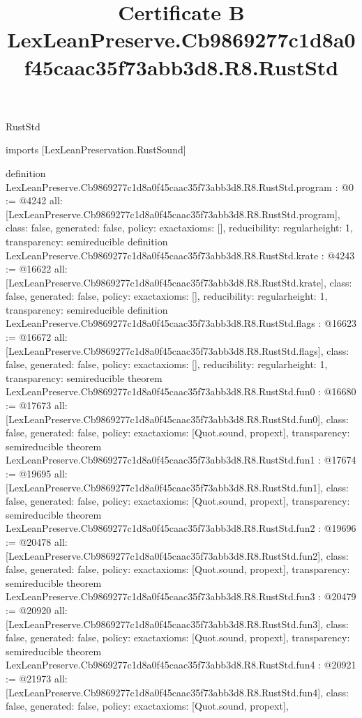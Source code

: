 \begin{lexlean}{RustStd}
\title{Certificate B LexLeanPreserve.Cb9869277c1d8a0f45caac35f73abb3d8.R8.RustStd}
\begin{coremodule}
imports [LexLeanPreservation.RustSound]

definition LexLeanPreserve.Cb9869277c1d8a0f45caac35f73abb3d8.R8.RustStd.program : @0 := @4242 {
  all: [LexLeanPreserve.Cb9869277c1d8a0f45caac35f73abb3d8.R8.RustStd.program],
  class: false,
  generated: false,
  policy: exact{axioms: []},
  reducibility: regular{height: 1},
  transparency: semireducible
}
definition LexLeanPreserve.Cb9869277c1d8a0f45caac35f73abb3d8.R8.RustStd.krate : @4243 := @16622 {
  all: [LexLeanPreserve.Cb9869277c1d8a0f45caac35f73abb3d8.R8.RustStd.krate],
  class: false,
  generated: false,
  policy: exact{axioms: []},
  reducibility: regular{height: 1},
  transparency: semireducible
}
definition LexLeanPreserve.Cb9869277c1d8a0f45caac35f73abb3d8.R8.RustStd.flags : @16623 := @16672 {
  all: [LexLeanPreserve.Cb9869277c1d8a0f45caac35f73abb3d8.R8.RustStd.flags],
  class: false,
  generated: false,
  policy: exact{axioms: []},
  reducibility: regular{height: 1},
  transparency: semireducible
}
theorem LexLeanPreserve.Cb9869277c1d8a0f45caac35f73abb3d8.R8.RustStd.fun0 : @16680 := @17673 {
  all: [LexLeanPreserve.Cb9869277c1d8a0f45caac35f73abb3d8.R8.RustStd.fun0],
  class: false,
  generated: false,
  policy: exact{axioms: [Quot.sound, propext]},
  transparency: semireducible
}
theorem LexLeanPreserve.Cb9869277c1d8a0f45caac35f73abb3d8.R8.RustStd.fun1 : @17674 := @19695 {
  all: [LexLeanPreserve.Cb9869277c1d8a0f45caac35f73abb3d8.R8.RustStd.fun1],
  class: false,
  generated: false,
  policy: exact{axioms: [Quot.sound, propext]},
  transparency: semireducible
}
theorem LexLeanPreserve.Cb9869277c1d8a0f45caac35f73abb3d8.R8.RustStd.fun2 : @19696 := @20478 {
  all: [LexLeanPreserve.Cb9869277c1d8a0f45caac35f73abb3d8.R8.RustStd.fun2],
  class: false,
  generated: false,
  policy: exact{axioms: [Quot.sound, propext]},
  transparency: semireducible
}
theorem LexLeanPreserve.Cb9869277c1d8a0f45caac35f73abb3d8.R8.RustStd.fun3 : @20479 := @20920 {
  all: [LexLeanPreserve.Cb9869277c1d8a0f45caac35f73abb3d8.R8.RustStd.fun3],
  class: false,
  generated: false,
  policy: exact{axioms: [Quot.sound, propext]},
  transparency: semireducible
}
theorem LexLeanPreserve.Cb9869277c1d8a0f45caac35f73abb3d8.R8.RustStd.fun4 : @20921 := @21973 {
  all: [LexLeanPreserve.Cb9869277c1d8a0f45caac35f73abb3d8.R8.RustStd.fun4],
  class: false,
  generated: false,
  policy: exact{axioms: [Quot.sound, propext]},
}
\end{coremodule}
\end{lexlean}
